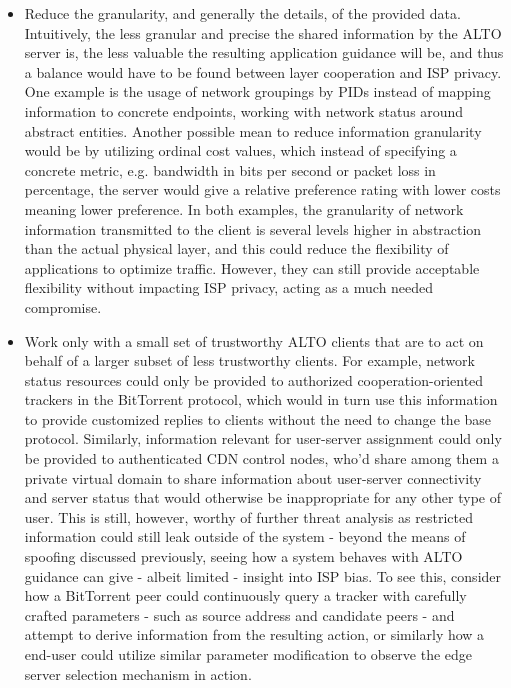 \begin{itemize}
    \item Reduce the granularity, and generally the details, of the provided data.
        Intuitively, the less granular and precise the shared information by the ALTO server is, the less valuable the resulting application guidance will be, and thus a balance would have to be found between layer cooperation and ISP privacy.
        One example is the usage of network groupings by PIDs instead of mapping information to concrete endpoints, working with network status around abstract entities.
        Another possible mean to reduce information granularity would be by utilizing ordinal cost values, which instead of specifying a concrete metric, e.g. bandwidth in bits per second or packet loss in percentage, the server would give a relative preference rating with lower costs meaning lower preference.
        In both examples, the granularity of network information transmitted to the client is several levels higher in abstraction than the actual physical layer, and this could reduce the flexibility of applications to optimize traffic.
        However, they can still provide acceptable flexibility without impacting ISP privacy, acting as a much needed compromise.

    \item Work only with a small set of trustworthy ALTO clients that are to act on behalf of a larger subset of less trustworthy clients.
        For example, network status resources could only be provided to authorized cooperation-oriented trackers in the BitTorrent protocol, which would in turn use this information to provide customized replies to clients without the need to change the base protocol.
        Similarly, information relevant for user-server assignment could only be provided to authenticated CDN control nodes, who'd share among them a private virtual domain to share information about user-server connectivity and server status that would otherwise be inappropriate for any other type of user.
        This is still, however, worthy of further threat analysis as restricted information could still leak outside of the system - beyond the means of spoofing discussed previously, seeing how a system behaves with ALTO guidance can give - albeit limited - insight into ISP bias.
        To see this, consider how a BitTorrent peer could continuously query a tracker with carefully crafted parameters - such as source address and candidate peers - and attempt to derive information from the resulting action, or similarly how a end-user could utilize similar parameter modification to observe the edge server selection mechanism in action.


\end{itemize}
